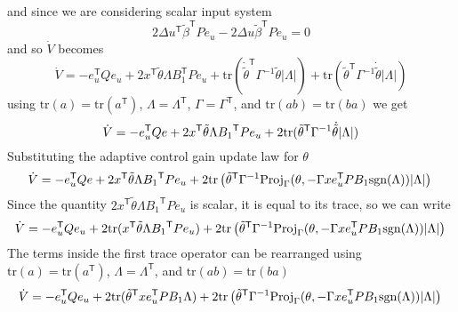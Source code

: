 and since we are considering scalar input system
\begin{equation*}
  2 \Delta u^{\mathsf{T}}\tilde{\beta}^{\mathsf{T}}Pe_{u}-
  2\Delta u \tilde{\beta}^{\mathsf{T}}Pe_{u}=0
\end{equation*}
and so $\dot{V}$ becomes
\begin{equation*}
  \dot{V}=-e_{u}^{\mathsf{T}}Qe_{u}+
  2x^{\mathsf{T}}\tilde{\theta}\Lambda B_{1}^{\mathsf{T}}Pe_{u}+
  \text{tr}(\dot{\tilde{\theta}}^{\mathsf{T}}\Gamma^{-1}\tilde{\theta}|\Lambda|)+
  \text{tr}({\tilde{\theta}}^{\mathsf{T}}\Gamma^{-1}\dot{\tilde{\theta}}|\Lambda|)
\end{equation*}
using $\text{tr}(a)=\text{tr}(a^{\mathsf{T}})$, $\Lambda=\Lambda^{\mathsf{T}}$, $\Gamma=\Gamma^{\mathsf{T}}$, and $\text{tr}(ab)=\text{tr}(ba)$ we get
\begin{equation*}
  \dot{V}=-e_{u}^{\mathsf{T}}Qe+2x^{\mathsf{T}}{\tilde{\theta}}\Lambda{B_{1}}^{\mathsf{T}}Pe_{u}
  +2\text{tr}({\tilde{\theta}}^{\mathsf{T}}\Gamma^{-1}\dot{\tilde{\theta}}|\Lambda|) \\
\end{equation*}
Substituting the adaptive control gain update law for $\theta$
\begin{equation*}
  \dot{V}=-e_{u}^{\mathsf{T}}Qe+2x^{\mathsf{T}}{\tilde{\theta}}\Lambda{B_{1}}^{\mathsf{T}}Pe_{u}
  +2\text{tr}\left({\tilde{\theta}}^{\mathsf{T}}\Gamma^{-1}\text{Proj}_{\Gamma}(\theta,-\Gamma xe_{u}^{\mathsf{T}}PB_{1}\text{sgn}(\Lambda))|\Lambda|\right) \\
\end{equation*}
Since the quantity $2x^{\mathsf{T}}{\tilde{\theta}}\Lambda{B_{1}}^{\mathsf{T}}Pe_{u}$ is scalar, it is equal to its trace, so we can write
\begin{equation*}
  \dot{V}=-e_{u}^{\mathsf{T}}Qe_{u}+2\text{tr}(x^{\mathsf{T}}{\tilde{\theta}}\Lambda{B_{1}}^{\mathsf{T}}Pe_{u})
  +2\text{tr}\left({\tilde{\theta}}^{\mathsf{T}}\Gamma^{-1}\text{Proj}_{\Gamma}(\theta,-\Gamma xe_{u}^{\mathsf{T}}PB_{1}\text{sgn}(\Lambda))|\Lambda|\right) \\
\end{equation*}
The terms inside the first trace operator can be rearranged using $\text{tr}(a)=\text{tr}(a^{\mathsf{T}})$, $\Lambda=\Lambda^{\mathsf{T}}$, and $\text{tr}(ab)=\text{tr}(ba)$
\begin{equation*}
  \dot{V}=-e_{u}^{\mathsf{T}}Qe_{u}+2\text{tr}(\tilde{\theta}^{\mathsf{T}}xe_{u}^{\mathsf{T}}PB_{1}\Lambda)
  +2\text{tr}\left({\tilde{\theta}}^{\mathsf{T}}\Gamma^{-1}\text{Proj}_{\Gamma}(\theta,-\Gamma xe_{u}^{\mathsf{T}}PB_{1}\text{sgn}(\Lambda))|\Lambda|\right) \\
\end{equation*}
